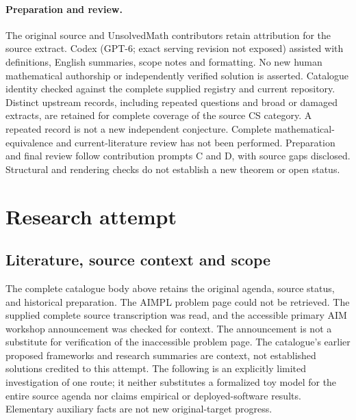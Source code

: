 \documentclass[11pt]{article}
\begin{document}
\paragraph{Preparation and review.}
The original source and UnsolvedMath contributors retain attribution for the source extract. Codex (GPT-6; exact serving revision not exposed) assisted with definitions, English summaries, scope notes and formatting. No new human mathematical authorship or independently verified solution is asserted. Catalogue identity checked against the complete supplied registry and current repository. Distinct upstream records, including repeated questions and broad or damaged extracts, are retained for complete coverage of the source CS category. A repeated record is not a new independent conjecture. Complete mathematical-equivalence and current-literature review has not been performed. Preparation and final review follow contribution prompts C and D, with source gaps disclosed. Structural and rendering checks do not establish a new theorem or open status.
\label{end:statement}

\section{Research attempt}
\subsection{Literature, source context and scope}
The complete catalogue body above retains the original agenda, source status, and historical preparation. The AIMPL problem page could not be retrieved. The supplied complete source transcription was read, and the accessible primary AIM workshop announcement was checked for context. The announcement is not a substitute for verification of the inaccessible problem page. The catalogue's earlier proposed frameworks and research summaries are context, not established solutions credited to this attempt. The following is an explicitly limited investigation of one route; it neither substitutes a formalized toy model for the entire source agenda nor claims empirical or deployed-software results. Elementary auxiliary facts are not new original-target progress.
\end{document}
